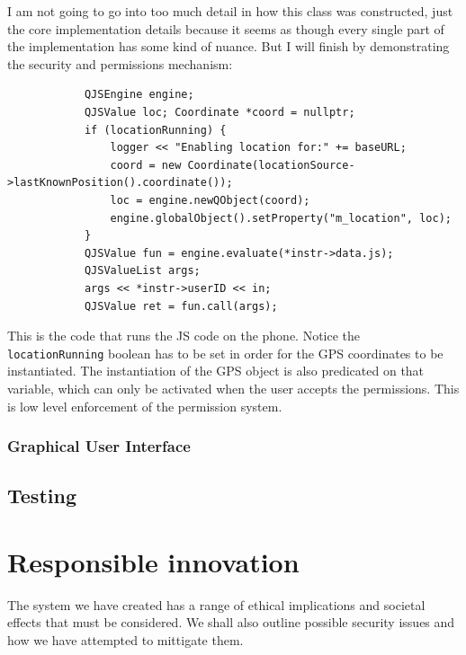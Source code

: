 \documentclass{article}
\begin{document}
I am not going to go into too much detail in how this class was constructed, just the core implementation details because it seems
as though every single part of the implementation has some kind of nuance. But I will finish by demonstrating the security and permissions
mechanism:
\begin{verbatim}
            QJSEngine engine;
            QJSValue loc; Coordinate *coord = nullptr;
            if (locationRunning) {
                logger << "Enabling location for:" += baseURL;
                coord = new Coordinate(locationSource->lastKnownPosition().coordinate());
                loc = engine.newQObject(coord);
                engine.globalObject().setProperty("m_location", loc);
            }
            QJSValue fun = engine.evaluate(*instr->data.js);
            QJSValueList args;
            args << *instr->userID << in;
            QJSValue ret = fun.call(args);
\end{verbatim}
This is the code that runs the JS code on the phone. Notice the \texttt{locationRunning} boolean has to be set in order for the
GPS coordinates to be instantiated. The instantiation of the GPS object is also predicated on that variable, which can only be activated
when the user accepts the permissions. This is low level enforcement of the permission system.

\subsubsection{Graphical User Interface}
\subsection{Testing}
\section{Responsible innovation}
The system we have created has a range of ethical implications and societal effects that must be considered. We shall also outline possible
security issues and how we have attempted to mittigate them.
\end{document}
